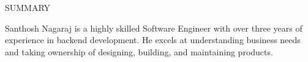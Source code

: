 \documentclass{resume} %
\begin{document}

\begin{rSection}{SUMMARY}

{Santhosh Nagaraj is a highly skilled Software Engineer with over three years of experience in backend development. He excels at understanding business needs and taking ownership of designing, building, and maintaining products.}

\end{rSection}

\end{document}
